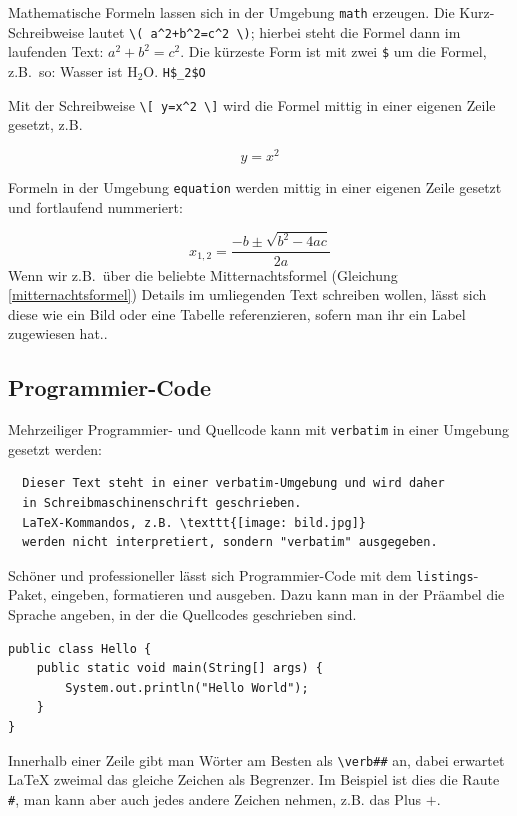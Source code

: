 Mathematische Formeln lassen sich in der Umgebung  \verb|math| erzeugen. Die Kurz- Schreibweise lautet \verb|\( a^2+b^2=c^2 \)|;  hierbei steht die Formel dann im laufenden Text: \( a^2+b^2=c^2 \). Die kürzeste Form ist mit zwei \verb|$| um die Formel, z.B.~so: Wasser ist H$_2$O. \verb|H$_2$O|

Mit der Schreibweise \verb|\[ y=x^2 \]| wird die Formel mittig in einer eigenen Zeile gesetzt, z.B.

\[y = x^2 \]

Formeln in der Umgebung \verb|equation| werden mittig in einer eigenen Zeile gesetzt und fortlaufend nummeriert:

\begin{equation}
x_{1,2} = \frac{-b\pm\sqrt{b^2-4ac}}{2a}
\label{mitternachtsformel}
\end{equation}
Wenn wir z.B.~über die beliebte Mitternachtsformel (Gleichung \ref{mitternachtsformel}) Details im umliegenden Text schreiben wollen, lässt sich diese wie ein Bild oder eine Tabelle referenzieren, sofern man ihr ein Label zugewiesen hat..


\subsection{Programmier-Code}

Mehrzeiliger Programmier- und Quellcode kann mit \verb|verbatim| in einer Umgebung gesetzt werden:

\begin{verbatim}
  Dieser Text steht in einer verbatim-Umgebung und wird daher
  in Schreibmaschinenschrift geschrieben.
  LaTeX-Kommandos, z.B. \texttt{[image: bild.jpg]}
  werden nicht interpretiert, sondern "verbatim" ausgegeben.
\end{verbatim}

Schöner und professioneller lässt sich Programmier-Code mit dem \verb|listings|-Paket, eingeben, formatieren und ausgeben. Dazu kann man in der Präambel die Sprache angeben, in der die Quellcodes geschrieben sind.

\begin{lstlisting}
public class Hello {
    public static void main(String[] args) {
        System.out.println("Hello World");
    }
}
\end{lstlisting}

Innerhalb einer Zeile gibt man Wörter am Besten als \verb|\verb##| an, dabei erwartet \LaTeX{} zweimal das gleiche Zeichen als Begrenzer. Im Beispiel ist dies die Raute \verb|#|, man kann aber auch jedes andere Zeichen nehmen, z.B. das Plus $+$.



